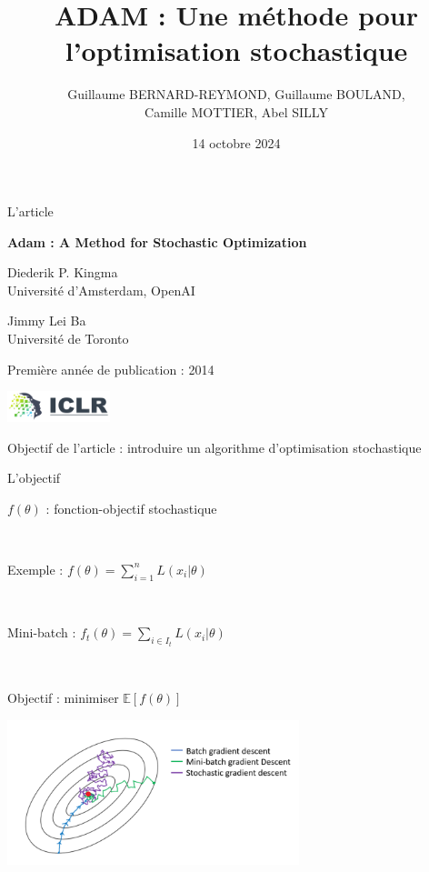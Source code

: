 \documentclass[11pt,aspectratio=169,xcolor=dvipsnames, french]{beamer}
\title{ADAM : Une méthode pour l'optimisation stochastique}
\author{Guillaume BERNARD-REYMOND, Guillaume BOULAND,\\ Camille MOTTIER, Abel SILLY}
\date{14 octobre 2024}
\begin{document}
\frame{\titlepage}

\begin{frame}{L'article}
\begin{center}
 \textbf{Adam : A Method for Stochastic Optimization}

\begin{multicols}{2}

 {\small Diederik P. Kingma}\\
 {\footnotesize Université d'Amsterdam, OpenAI}
 
 \columnbreak
 
 {\small Jimmy Lei Ba}\\
 {\footnotesize Université de Toronto}
\end{multicols}

Première année de publication : 2014

\includegraphics[width=3cm]{ICLR_Logo.png}

Objectif de l'article : introduire un algorithme d'optimisation stochastique
\end{center}

\end{frame}

\begin{frame}{L'objectif}
	\begin{minipage}[c]{.4\linewidth}
$f(\theta)$ : fonction-objectif stochastique 

\

Exemple : $f(\theta)=\displaystyle\sum_{i=1}^{n}L(x_i|\theta)$ 

\

Mini-batch : $f_t(\theta)=\displaystyle \sum_{i\in I_t}L(x_i|\theta)$

\

Objectif : minimiser $\mathbb E[f(\theta)]$
	\end{minipage} \hfill
	\begin{minipage}[c]{.55\linewidth}
	\includegraphics[width=8.5cm]{batch.png}

	\end{minipage}




\end{frame}
\end{document}
